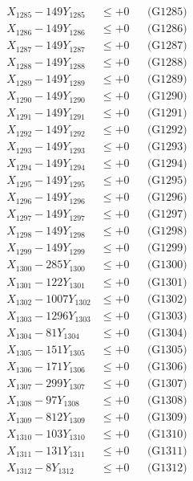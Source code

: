 \documentclass[a4paper,10pt]{article}
\begin{document}
{\begin{align}
X_{1285} - 149Y_{1285} &\leq +0 && \text{(G1285)} \\
X_{1286} - 149Y_{1286} &\leq +0 && \text{(G1286)} \\
X_{1287} - 149Y_{1287} &\leq +0 && \text{(G1287)} \\
X_{1288} - 149Y_{1288} &\leq +0 && \text{(G1288)} \\
X_{1289} - 149Y_{1289} &\leq +0 && \text{(G1289)} \\
X_{1290} - 149Y_{1290} &\leq +0 && \text{(G1290)} \\
\allowbreak
X_{1291} - 149Y_{1291} &\leq +0 && \text{(G1291)} \\
X_{1292} - 149Y_{1292} &\leq +0 && \text{(G1292)} \\
X_{1293} - 149Y_{1293} &\leq +0 && \text{(G1293)} \\
X_{1294} - 149Y_{1294} &\leq +0 && \text{(G1294)} \\
X_{1295} - 149Y_{1295} &\leq +0 && \text{(G1295)} \\
X_{1296} - 149Y_{1296} &\leq +0 && \text{(G1296)} \\
X_{1297} - 149Y_{1297} &\leq +0 && \text{(G1297)} \\
X_{1298} - 149Y_{1298} &\leq +0 && \text{(G1298)} \\
X_{1299} - 149Y_{1299} &\leq +0 && \text{(G1299)} \\
X_{1300} - 285Y_{1300} &\leq +0 && \text{(G1300)} \\
\allowbreak
X_{1301} - 122Y_{1301} &\leq +0 && \text{(G1301)} \\
X_{1302} - 1007Y_{1302} &\leq +0 && \text{(G1302)} \\
X_{1303} - 1296Y_{1303} &\leq +0 && \text{(G1303)} \\
X_{1304} - 81Y_{1304} &\leq +0 && \text{(G1304)} \\
X_{1305} - 151Y_{1305} &\leq +0 && \text{(G1305)} \\
X_{1306} - 171Y_{1306} &\leq +0 && \text{(G1306)} \\
X_{1307} - 299Y_{1307} &\leq +0 && \text{(G1307)} \\
X_{1308} - 97Y_{1308} &\leq +0 && \text{(G1308)} \\
X_{1309} - 812Y_{1309} &\leq +0 && \text{(G1309)} \\
X_{1310} - 103Y_{1310} &\leq +0 && \text{(G1310)} \\
\allowbreak
X_{1311} - 131Y_{1311} &\leq +0 && \text{(G1311)} \\
X_{1312} - 8Y_{1312} &\leq +0 && \text{(G1312)} \\

\end{align}}
\end{document}
